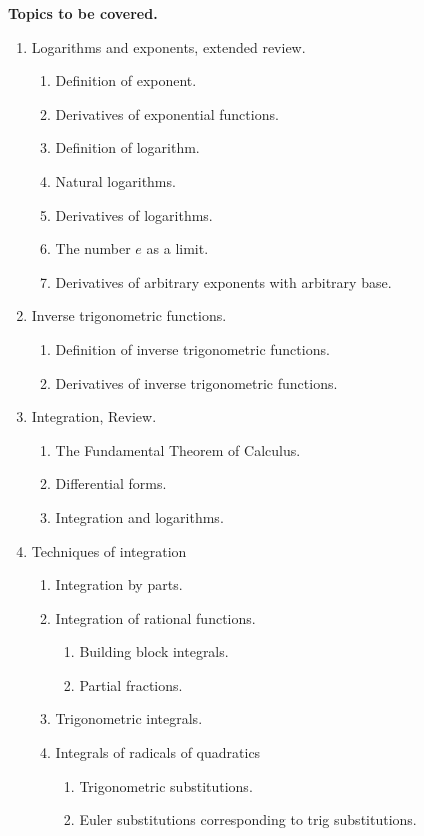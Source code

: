 \documentclass{article}
\begin{document}
\medskip
\noindent \textbf{Topics to be covered.} 
\renewcommand{\theenumii}{\arabic{enumii}}
\begin{enumerate}
\item Logarithms and exponents, extended review.
\begin{enumerate}
\item Definition of exponent.
\item Derivatives of exponential functions.
\item Definition of logarithm.
\item Natural logarithms.
\item Derivatives of logarithms.
\item The number $e$ as a limit.
\item Derivatives of arbitrary exponents with arbitrary base.
\end{enumerate}
\item Inverse trigonometric functions.
\begin{enumerate}
\item Definition of inverse trigonometric functions.
\item Derivatives of inverse trigonometric functions.
\end{enumerate}
\item Integration, Review.
\begin{enumerate}
\item The Fundamental Theorem of Calculus.
\item Differential forms.
\item Integration and logarithms.
\end{enumerate}
\item Techniques of integration
\begin{enumerate}
\item Integration by parts.
\item Integration of rational functions.
\begin{enumerate}
\item Building block integrals.
\item Partial fractions.
\end{enumerate}
\item Trigonometric integrals.
\item Integrals of radicals of quadratics
\begin{enumerate}
\item Trigonometric substitutions.
\item Euler substitutions corresponding to trig substitutions.
\end{enumerate}

\end{enumerate}
\end{enumerate}
\end{document}
